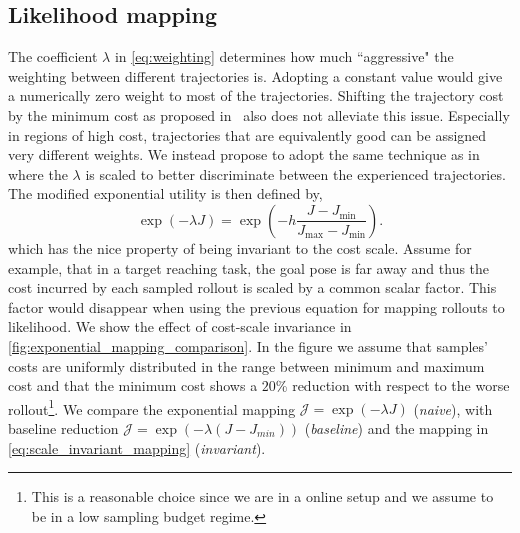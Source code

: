 \subsection{Likelihood mapping} 
The coefficient $\lambda$ in \eqref{eq:weighting} determines how much ``aggressive" the weighting between different trajectories is. Adopting a constant value would give a numerically zero weight to most of the trajectories. Shifting the trajectory cost by the minimum cost as proposed in~\cite{williams_information_2017} also does not alleviate this issue. 
Especially in regions of high cost, trajectories that are equivalently good can be assigned very different weights. We instead propose to adopt the same technique as in~\cite{theodorou2010generalized} where the $\lambda$ is scaled to better discriminate between the experienced trajectories. The modified exponential utility is then defined by,
\begin{equation} \label{eq:scale_invariant_mapping}
    \exp (-\lambda J ) = \exp \left( -h \frac{J - J_{\min}}{J_{\max} - J_{\min}} \right).
\end{equation}
which has the nice property of being invariant to the cost scale. Assume for example, that in a target reaching task, the goal pose is far away and thus the cost incurred by each sampled rollout is scaled by a common scalar factor. This factor would disappear when using the previous equation for mapping rollouts to likelihood. We show the effect of cost-scale invariance in \fig \ref{fig:exponential_mapping_comparison}. In the figure we assume that samples' costs are uniformly distributed in the range between minimum and maximum cost and that the minimum cost shows a $20$\% reduction with respect to the worse rollout\footnote{This is a reasonable choice since we are in a online setup and we assume to be in a low sampling budget regime.}. We compare the exponential mapping $\mathcal{J} = \exp(-\lambda J)$ (\textit{naive}), with baseline reduction $\mathcal{J} = \exp(-\lambda (J - J_{min}))$ (\textit{baseline}) and the mapping in \eqref{eq:scale_invariant_mapping} (\textit{invariant}).

